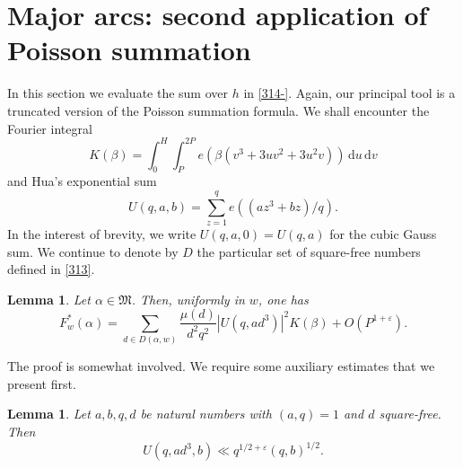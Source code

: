 \documentclass[reqno]{amsart}
\newtheorem{lemma}[thm]{Lemma}
\numberwithin{equation}{section}
\begin{document}
\section{Major arcs: second application of Poisson summation}
In this section we evaluate the sum over $h$ in \eqref{314-}. Again, our principal tool is a truncated version of the Poisson summation formula. We shall encounter the Fourier integral
\begin{equation}\label{321} 
 K(\beta) = \int_0^H\!\!\!\int_P^{2P} e(\beta(v^3+3uv^2+3u^2v))\,\mathrm du\,\mathrm dv \end{equation}
and Hua's exponential sum
\begin{equation}\label{322} U(q,a,b) = \sum_{z=1}^q e((az^3+bz)/q).\end{equation}
In the interest of brevity, we write $U(q,a,0)=U(q,a)$ for the cubic Gauss sum. {We continue to denote by $D$ the particular set of square-free numbers defined in \eqref{313}.}

\begin{lemma}\label{L37} Let $\alpha\in\mathfrak M$. Then, uniformly in $w$, one has
$$ F^*_w(\alpha) = \sum_{d\in D(\alpha,w)} \frac{\mu(d)}{d^2q^2 } |U(q,ad^3)|^2 K(\beta) + O(P^{1+\varepsilon}). $$ 
\end{lemma}

The proof is somewhat involved. We require some auxiliary estimates that we present first.

\begin{lemma}\label{Huasum} Let $a,b,q,d$ be natural numbers with $(a,q)=1$ and $d$ square-free. Then
$$ U(q,ad^3,b) \ll q^{1/2+\varepsilon} (q,b)^{1/2}. $$
\end{lemma} 
\end{document}
